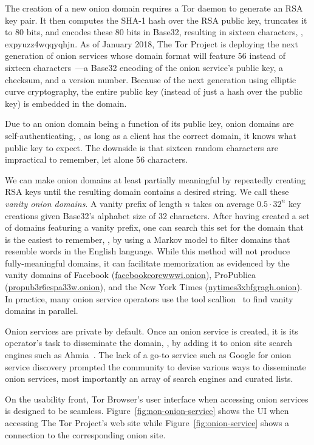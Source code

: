 The creation of a new onion domain requires a Tor daemon to generate an RSA key
pair.  It then computes the SHA-1 hash over the RSA public key, truncates it to
80 bits, and encodes these 80 bits in Base32, resulting in sixteen characters,
\eg, expyuzz4wqqyqhjn.  As of January 2018, The Tor Project is deploying the
next generation of onion services whose domain format will feature 56 instead of
sixteen characters~\cite[\S~6]{Mathewson2013a}---a Base32 encoding of the onion
service's public key, a checksum, and a version number.  Because of the next
generation using elliptic curve cryptography, the entire public key (instead of
just a hash over the public key) is embedded in the domain.

Due to an onion domain being a function of its public key, onion domains are
self-authenticating, \ie, as long as a client has the correct domain, it knows
what public key to expect.  The downside is that sixteen random characters are
impractical to remember, let alone 56 characters.

We can make onion domains at least partially meaningful by repeatedly creating
RSA keys until the resulting domain contains a desired string.  We call these
\emph{vanity onion domains}.  A vanity prefix of length $n$ takes on average
$0.5 \cdot 32^n$ key creations given Base32's alphabet size of 32 characters.
After having created a set of domains featuring a vanity prefix, one can search
this set for the domain that is the easiest to remember, \eg, by using a Markov
model to filter domains that resemble words in the English language.  While this
method will not produce fully-meaningful domains, it can facilitate memorization
as evidenced by the vanity domains of Facebook
(\href{https://www.facebookcorewwwi.onion}{facebookcorewwwi.onion}),
ProPublica
(\href{http://propub3r6espa33w.onion}{propub3r6espa33w.onion}),
and the New York Times
(\href{https://www.nytimes3xbfgragh.onion}{nytimes3xbfgragh.onion}).  In
practice, many onion service operators use the tool scallion~\cite{scallion} to
find vanity domains in parallel.

Onion services are private by default.  Once an onion service is created, it is
its operator's task to disseminate the domain, \eg, by adding it to onion site
search engines such as Ahmia~\cite{ahmia}.  The lack of a go-to service such as
Google for onion service discovery prompted the community to devise various ways
to disseminate onion services, most importantly an array of search engines and
curated lists.

On the usability front, Tor Browser's user interface when accessing onion
services is designed to be seamless.  Figure~\ref{fig:non-onion-service} shows
the UI when accessing The Tor Project's web site while
Figure~\ref{fig:onion-service} shows a connection to the corresponding onion
site.

